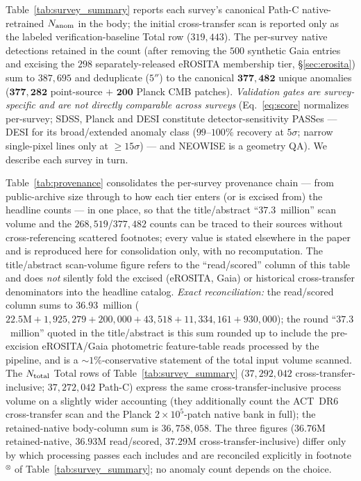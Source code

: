 \documentclass[aps,prd,twocolumn,superscriptaddress,showpacs,preprintnumbers,nofootinbib,longbibliography,floatfix]{revtex4-2}
\begin{document}
Table~\ref{tab:survey_summary} reports each survey's canonical Path-C native-retrained $N_{\rm anom}$ in the body; the initial cross-transfer scan is reported only as the labeled verification-baseline Total row ($319{,}443$). The per-survey native detections retained in the count (after removing the $500$ synthetic Gaia entries and excising the $298$ separately-released eROSITA membership tier, \S\ref{sec:erosita}) sum to $387{,}695$ and deduplicate ($5''$) to the canonical $\mathbf{377{,}482}$ unique anomalies ($\mathbf{377{,}282}$ point-source $+$ $\mathbf{200}$ Planck CMB patches). \emph{Validation gates are survey-specific and are not directly comparable across surveys} (Eq.~\ref{eq:score} normalizes per-survey; SDSS, Planck and DESI constitute detector-sensitivity PASSes --- DESI for its broad/extended anomaly class ($99$--$100\%$ recovery at $5\sigma$; narrow single-pixel lines only at $\geq\!15\sigma$) --- and NEOWISE is a geometry QA). We describe each survey in turn.

Table~\ref{tab:provenance} consolidates the per-survey provenance chain --- from public-archive size through to how each tier enters (or is excised from) the headline counts --- in one place, so that the title/abstract ``$37.3$~million'' scan volume and the $268{,}519$/$377{,}482$ counts can be traced to their sources without cross-referencing scattered footnotes; every value is stated elsewhere in the paper and is reproduced here for consolidation only, with no recomputation. The title/abstract scan-volume figure refers to the ``read/scored'' column of this table and does \emph{not} silently fold the excised (eROSITA, Gaia) or historical cross-transfer denominators into the headline catalog. \emph{Exact reconciliation:} the read/scored column sums to $36.93$~million ($22.5\mathrm{M} + 1{,}925{,}279 + 200{,}000 + 43{,}518 + 11{,}334{,}161 + 930{,}000$); the round ``$37.3$~million'' quoted in the title/abstract is this sum rounded up to include the pre-excision eROSITA/Gaia photometric feature-table reads processed by the pipeline, and is a ${\sim}1\%$-conservative statement of the total input volume scanned. The $N_{\rm total}$ Total rows of Table~\ref{tab:survey_summary} ($37{,}292{,}042$ cross-transfer-inclusive; $37{,}272{,}042$ Path-C) express the same cross-transfer-inclusive process volume on a slightly wider accounting (they additionally count the ACT~DR6 cross-transfer scan and the Planck $2\times10^{5}$-patch native bank in full); the retained-native body-column sum is $36{,}758{,}058$. The three figures ($36.76$M retained-native, $36.93$M read/scored, $37.29$M cross-transfer-inclusive) differ only by which processing passes each includes and are reconciled explicitly in footnote $^{\otimes}$ of Table~\ref{tab:survey_summary}; no anomaly count depends on the choice.
\end{document}
